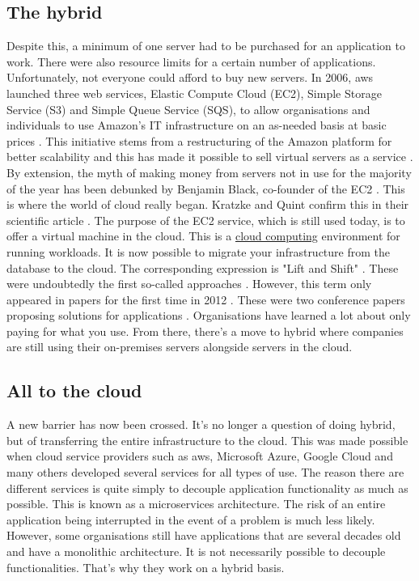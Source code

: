 \subsection{The hybrid}
Despite this, a minimum of one server had to be purchased for an application to work. There were also resource limits for a certain number of applications. Unfortunately, not everyone could afford to buy new servers. In 2006, \gls{aws} launched three web services, Elastic Compute Cloud (EC2), Simple Storage Service (S3) and Simple Queue Service (SQS), to allow organisations and individuals to use Amazon's IT infrastructure on an as-needed basis at basic prices \cite{evaluation_aws_services}. This initiative stems from a restructuring of the Amazon platform for better scalability and this has made it possible to sell virtual servers as a service \cite{ec2_origins}. By extension, the myth of making money from servers not in use for the majority of the year has been debunked by Benjamin Black, co-founder of the EC2 \cite{ec2_origins}. This is where the world of \gls{cloud} really began. Kratzke and Quint confirm this in their scientific article \cite{understanding_cloud_native}. The purpose of the EC2 service, which is still used today, is to offer a virtual machine in the \gls{cloud}. This is a \hyperref[subsec:cloudcomputing]{cloud computing} environment for running workloads. It is now possible to migrate your infrastructure from the database to the \gls{cloud}. The corresponding expression is "Lift and Shift" \cite{ibm_lifAndShift}. These were undoubtedly the first so-called  approaches \cite{history_cloud_native}. However, this term only appeared in papers for the first time in 2012 \cite{understanding_cloud_native}. These were two conference papers proposing solutions for  applications \cite{closer12, 4caast}. Organisations have learned a lot about only paying for what you use. From there, there's a move to hybrid where companies are still using their on-premises servers alongside servers in the \gls{cloud}. \cite{history_cloud_native}

\subsection{All to the \texorpdfstring{\gls{cloud}}{}}
A new barrier has now been crossed. It's no longer a question of doing hybrid, but of transferring the entire infrastructure to the \gls{cloud}. This was made possible when \gls{cloud} service providers such as \gls{aws}, Microsoft Azure, Google Cloud and many others developed several services for all types of use. The reason there are different services is quite simply to decouple application functionality as much as possible. This is known as a microservices architecture. The risk of an entire application being interrupted in the event of a problem is much less likely. However, some organisations still have applications that are several decades old and have a monolithic architecture. It is not necessarily possible to decouple functionalities. That's why they work on a hybrid basis. \cite{history_cloud_native}

